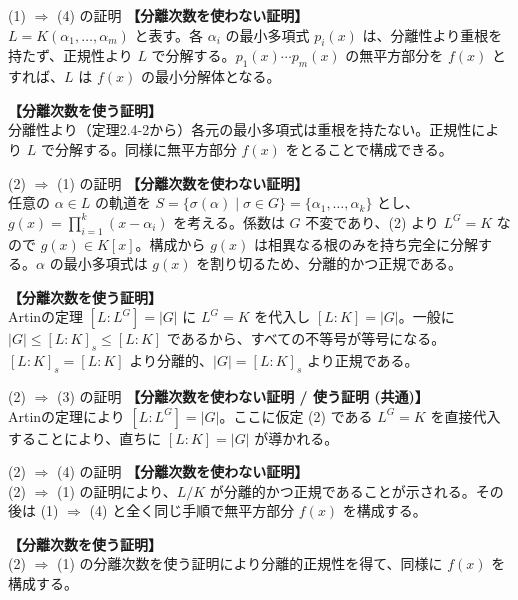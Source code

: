 \documentclass[11pt,dvipsnames]{beamer}
\begin{document}
\begin{frame}[allowframebreaks]{(1) $\Rightarrow$ (4) の証明}
    \textbf{【分離次数を使わない証明】}\\
    $L = K(\alpha_1, \dots, \alpha_m)$ と表す。各 $\alpha_i$ の最小多項式 $p_i(x)$ は、分離性より重根を持たず、正規性より $L$ で分解する。$p_1(x) \cdots p_m(x)$ の無平方部分を $f(x)$ とすれば、$L$ は $f(x)$ の最小分解体となる。

    \vspace{1em}
    \textbf{【分離次数を使う証明】}\\
    分離性より（定理2.4-2から）各元の最小多項式は重根を持たない。正規性により $L$ で分解する。同様に無平方部分 $f(x)$ をとることで構成できる。
\end{frame}


\begin{frame}[allowframebreaks]{(2) $\Rightarrow$ (1) の証明}
    \textbf{【分離次数を使わない証明】}\\
    任意の $\alpha \in L$ の軌道を $S = \{ \sigma(\alpha) \mid \sigma \in G \} = \{ \alpha_1, \dots, \alpha_k \}$ とし、$g(x) = \prod_{i=1}^k (x - \alpha_i)$ を考える。係数は $G$ 不変であり、(2) より $L^G = K$ なので $g(x) \in K[x]$。構成から $g(x)$ は相異なる根のみを持ち完全に分解する。$\alpha$ の最小多項式は $g(x)$ を割り切るため、分離的かつ正規である。

    \vspace{1em}
    \textbf{【分離次数を使う証明】}\\
    Artinの定理 $[L:L^G] = |G|$ に $L^G = K$ を代入し $[L:K] = |G|$。一般に $|G| \le [L:K]_s \le [L:K]$ であるから、すべての不等号が等号になる。$[L:K]_s = [L:K]$ より分離的、$|G| = [L:K]_s$ より正規である。
\end{frame}

\begin{frame}[allowframebreaks]{(2) $\Rightarrow$ (3) の証明}
    \textbf{【分離次数を使わない証明 / 使う証明 (共通)】}\\
    Artinの定理により $[L:L^G] = |G|$。ここに仮定 (2) である $L^G = K$ を直接代入することにより、直ちに $[L:K] = |G|$ が導かれる。
\end{frame}

\begin{frame}[allowframebreaks]{(2) $\Rightarrow$ (4) の証明}
    \textbf{【分離次数を使わない証明】}\\
    (2) $\Rightarrow$ (1) の証明により、$L/K$ が分離的かつ正規であることが示される。その後は (1) $\Rightarrow$ (4) と全く同じ手順で無平方部分 $f(x)$ を構成する。

    \vspace{1em}
    \textbf{【分離次数を使う証明】}\\
    (2) $\Rightarrow$ (1) の分離次数を使う証明により分離的正規性を得て、同様に $f(x)$ を構成する。
\end{frame}
\end{document}
